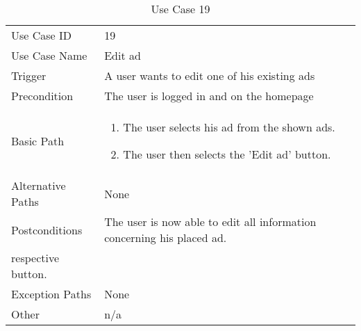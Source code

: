 \begin{table}[H]
\centering
\label{table-use-case-19}
\begin{tabular}{|p{3cm}|p{10cm}}
Use Case ID       & 19                                                        \\
Use Case Name     & Edit ad                            \\
Trigger           & A user wants to edit one of his existing ads\\
Precondition      & The user is logged in and on the homepage             \\
Basic Path        & \begin{enumerate}
\item The user selects his ad from the shown ads.
\item The user then selects the 'Edit ad' button.  
\end{enumerate} 
     \\
Alternative Paths & None                          \\
Postconditions    & The user is now able to edit all information concerning his
placed ad. \\
respective button.	\\
Exception Paths   & None			\\
Other             & n/a                                                                                                                                                                                                        
\end{tabular}
\caption{Use Case 19}
\end{table}



